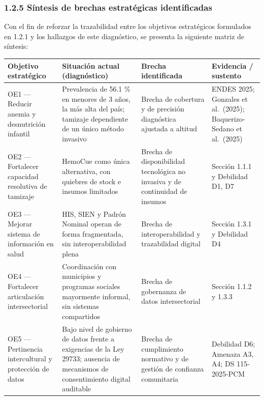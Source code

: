 \documentclass[11pt,a4paper]{article}
\begin{document}
\subsubsection{1.2.5 Síntesis de brechas estratégicas identificadas}\label{suxedntesis-de-brechas-estratuxe9gicas-identificadas}

Con el fin de reforzar la trazabilidad entre los objetivos estratégicos formulados en 1.2.1 y los hallazgos de este diagnóstico, se presenta la siguiente matriz de síntesis:

{\small
\begin{longtable}[]{@{}
  >{\raggedright\arraybackslash}p{}
  >{\raggedright\arraybackslash}p{}
  >{\raggedright\arraybackslash}p{}
  >{\raggedright\arraybackslash}p{}@{}}
\toprule\noalign{}
\begin{minipage}[b]{\linewidth}\raggedright
Objetivo estratégico
\end{minipage} & \begin{minipage}[b]{\linewidth}\raggedright
Situación actual (diagnóstico)
\end{minipage} & \begin{minipage}[b]{\linewidth}\raggedright
Brecha identificada
\end{minipage} & \begin{minipage}[b]{\linewidth}\raggedright
Evidencia / sustento
\end{minipage} \\
\midrule\noalign{}
\endhead
\bottomrule\noalign{}
\endlastfoot
OE1 --- Reducir anemia y desnutrición infantil & Prevalencia de 56.1 \% en menores de 3 años, la más alta del país; tamizaje dependiente de un único método invasivo & Brecha de cobertura y de precisión diagnóstica ajustada a altitud & ENDES 2025; Gonzales et al.~(2025); Baquerizo-Sedano et al.~(2025) \\
OE2 --- Fortalecer capacidad resolutiva de tamizaje & HemoCue como única alternativa, con quiebres de stock e insumos limitados & Brecha de disponibilidad tecnológica no invasiva y de continuidad de insumos & Sección 1.1.1 y Debilidad D1, D7 \\
OE3 --- Mejorar sistema de información en salud & HIS, SIEN y Padrón Nominal operan de forma fragmentada, sin interoperabilidad plena & Brecha de interoperabilidad y trazabilidad digital & Sección 1.3.1 y Debilidad D4 \\
OE4 --- Fortalecer articulación intersectorial & Coordinación con municipios y programas sociales mayormente informal, sin sistemas compartidos & Brecha de gobernanza de datos intersectorial & Sección 1.1.2 y 1.3.3 \\
OE5 --- Pertinencia intercultural y protección de datos & Bajo nivel de gobierno de datos frente a exigencias de la Ley 29733; ausencia de mecanismos de consentimiento digital auditable & Brecha de cumplimiento normativo y de gestión de confianza comunitaria & Debilidad D6; Amenaza A3, A4; DS 115-2025-PCM \\
\end{longtable}
}
\end{document}
